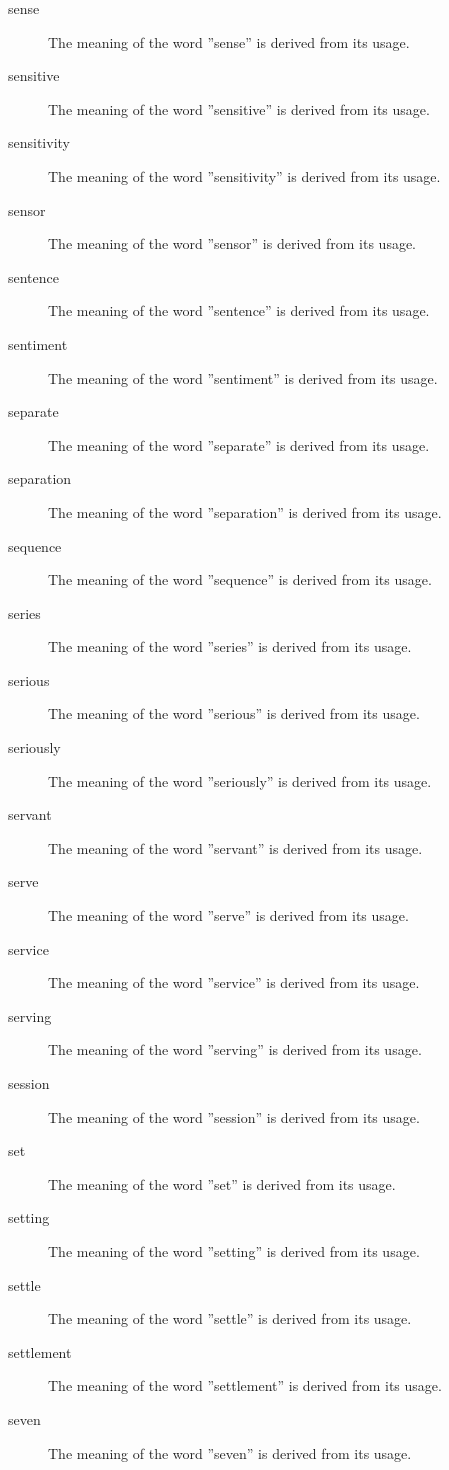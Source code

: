 \documentclass[12pt, letterpaper]{memoir}
\begin{document}
\begin{description}
\item[sense] The meaning of the word ''sense'' is derived from its usage.
\item[sensitive] The meaning of the word ''sensitive'' is derived from its usage.
\item[sensitivity] The meaning of the word ''sensitivity'' is derived from its usage.
\item[sensor] The meaning of the word ''sensor'' is derived from its usage.
\item[sentence] The meaning of the word ''sentence'' is derived from its usage.
\item[sentiment] The meaning of the word ''sentiment'' is derived from its usage.
\item[separate] The meaning of the word ''separate'' is derived from its usage.
\item[separation] The meaning of the word ''separation'' is derived from its usage.
\item[sequence] The meaning of the word ''sequence'' is derived from its usage.
\item[series] The meaning of the word ''series'' is derived from its usage.
\item[serious] The meaning of the word ''serious'' is derived from its usage.
\item[seriously] The meaning of the word ''seriously'' is derived from its usage.
\item[servant] The meaning of the word ''servant'' is derived from its usage.
\item[serve] The meaning of the word ''serve'' is derived from its usage.
\item[service] The meaning of the word ''service'' is derived from its usage.
\item[serving] The meaning of the word ''serving'' is derived from its usage.
\item[session] The meaning of the word ''session'' is derived from its usage.
\item[set] The meaning of the word ''set'' is derived from its usage.
\item[setting] The meaning of the word ''setting'' is derived from its usage.
\item[settle] The meaning of the word ''settle'' is derived from its usage.
\item[settlement] The meaning of the word ''settlement'' is derived from its usage.
\item[seven] The meaning of the word ''seven'' is derived from its usage.

\end{description}
\end{document}
